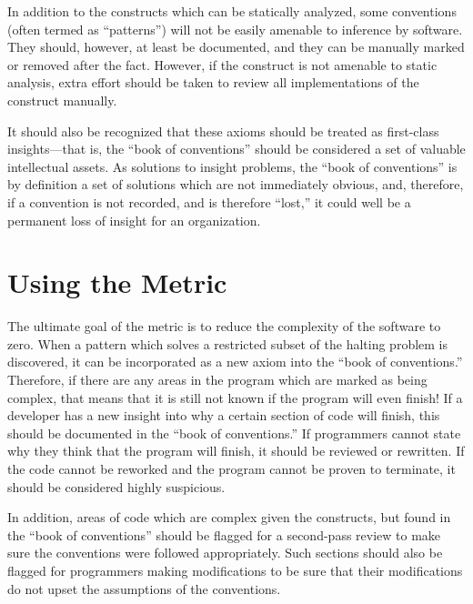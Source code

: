 In addition to the constructs which can be statically analyzed, some conventions (often termed as ``patterns'') will not be easily amenable to inference by software.  They should, however, at least be documented, and they can be manually marked or removed after the fact.  However, if the construct is not amenable to static analysis, extra effort should be taken to review all implementations of the construct manually.

It should also be recognized that these axioms should be treated as first-class insights---that is, the ``book of conventions'' should be considered a set of valuable intellectual assets.  As solutions to insight problems, the ``book of conventions'' is by definition a set of solutions which are not immediately obvious, and, therefore, if a convention is not recorded, and is therefore ``lost,'' it could well be a permanent loss of insight for an organization.


\section{Using the Metric}

The ultimate goal of the metric is to reduce the complexity of the software to zero. When a pattern which solves a restricted subset of the halting problem is discovered, it can be incorporated as a new axiom into the ``book of conventions.''  Therefore, if there are any areas in the program which are marked as being complex, that means that it is still not known if the program will even finish!  If a developer has a new insight into why a certain section of code will finish, this should be documented in the ``book of conventions.''  If programmers cannot state why they think that the program will finish, it should be reviewed or rewritten.  If the code cannot be reworked and the program cannot be proven to terminate, it should be considered highly suspicious.

In addition, areas of code which are complex given the constructs, but found in the ``book of conventions'' should be flagged for a second-pass review to make sure the conventions were followed appropriately.  Such sections should also be flagged for programmers making modifications to be sure that their modifications do not upset the assumptions of the conventions.

